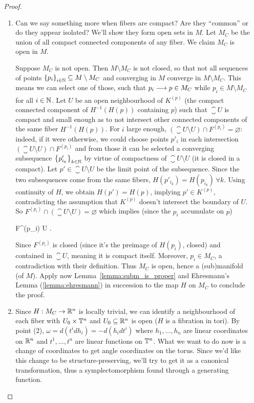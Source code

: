 \documentclass[main.tex]{subfiles}
\begin{document}
\begin{proof}
\begin{enumerate}
		\item Can we say something more when fibers are compact? Are they ``common'' or do they appear isolated? We'll show they form open sets in $M$. Let $M_C$ be the union of all compact connected components of any fiber. We claim $M_C$ is open in $M$.

		Suppose $M_C$ is not open. Then $M \setminus M_C$ is not closed, so that not all sequences of points $\left\{p_{i}\right\}_{i \in \mathbb{N}} \subseteq M \setminus M_C$ and converging in $M$ converge in $M \setminus M_C$. This means we can select one of those, such that $p_i \underset{{}}{\longrightarrow} p \in M_C$ while $p_i \in M \setminus M_C$ for all $i \in \mathbb{N}$. Let $U$ be an open neighbourhood of $K^{(p)}$ (the compact connected component of $H^{-1}(H(p))$ containing $p$) such that $\closure U$ is compact and small enough as to not intersect other connected components of the same fiber $H^{-1}(H(p))$. For $i$ large enough, $(\closure U \setminus U) \cap F^{(p_i)} = \varnothing$: indeed, if it were otherwise, we could choose points $p'_i$ in each intersection $(\closure U \setminus U) \cap F^{(p_i)}$ and from those it can be selected a converging subsequence $\left\{p'_{i_{k}}\right\}_{k \in \mathbb{N}}$ by virtue of compactness of $\closure U \setminus U$ (it is closed in a compact). Let $p' \in \closure U \setminus U$ be the limit point of the subsequence. Since the two subsequences come from the same fibers, $H(p'_{i_k}) = H(p_{i_k})\ \forall k$. Using continuity of $H$, we obtain $H(p') = H(p)$, implying $p' \in K^{(p)}$, contradicting the assumption that $K^{(p)}$ doesn't intersect the boundary of $U$. So $F^{(p_i)} \cap (\closure U \setminus U) = \varnothing$ which implies (since the $p_i$ accumulate on $p$)
		\begin{eqalign}
			F^{(p_i)} \subseteq U \quad \forall {}.
		\end{eqalign}
		Since $F^{(p_i)}$ is closed (since it's the preimage of $H(p_i)$, closed) and contained in $\closure U$, meaning it is compact itself. Moreover, $p_i \in M_C$, a contradiction with their definition. Thus $M_C$ is open, hence a (sub)manifold (of $M$). Apply now Lemma~\ref{lemma:subm_is_proper} and Ehresmann's Lemma (\ref{lemma:ehresmann}) in succession to the map $H$ on $M_C$ to conclude the proof.

		\item Since ${H: M_C \to \mathbb{R}^n}$ is locally trivial, we can identify a neighbourhood of each fiber with $U_0 \times \mathbb{T}^n$ and $U_0 \subseteq \mathbb{R}^n$ is open ($H$ is a fibration in tori). By point (2), $\omega = d(t^i dh_i) = -d(h_i dt^i)$ where $h_1, \ldots, h_n$ are linear coordinates on $\mathbb{R}^n$ and $t^1, \ldots, t^n$ are linear functions on $\mathbb{T}^n$. What we want to do now is a change of coordinates to get angle coordinates on the torus. Since we'd like this change to be structure-preserving, we'll try to get it as a canonical transformation, thus a symplectomorphism found through a generating function.


\end{enumerate}
\end{proof}
\end{document}
